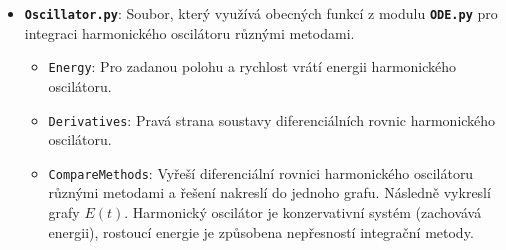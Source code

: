 \documentclass[a4paper,11pt,twoside]{article}
\def\code#1{\textnormal{\texttt{#1}}}
\def\file#1{\textnormal{\textbf{\texttt{#1}}}}
\begin{document}
\begin{solution}
\begin{itemize}
        \item \file{Oscillator.py}:
            Soubor, který využívá obecných funkcí z modulu \file{ODE.py} pro integraci harmonického oscilátoru různými metodami.
            \begin{itemize}
            \item \code{Energy}:
                Pro zadanou polohu a rychlost vrátí energii harmonického oscilátoru.
            \item \code{Derivatives}:
                Pravá strana soustavy diferenciálních rovnic harmonického oscilátoru. 
            \item \code{CompareMethods}:
                Vyřeší diferenciální rovnici harmonického oscilátoru různými metodami a řešení nakreslí do jednoho grafu.
                Následně vykreslí grafy $E(t)$.
                Harmonický oscilátor je konzervativní systém (zachovává energii), rostoucí energie je způsobena nepřesností integrační metody.
            \end{itemize}
        \end{itemize}


\end{solution}
\end{document}
